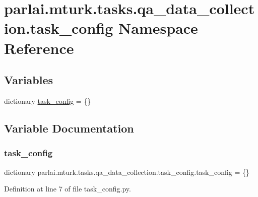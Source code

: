 \hypertarget{namespaceparlai_1_1mturk_1_1tasks_1_1qa__data__collection_1_1task__config}{}\section{parlai.\+mturk.\+tasks.\+qa\+\_\+data\+\_\+collection.\+task\+\_\+config Namespace Reference}
\label{namespaceparlai_1_1mturk_1_1tasks_1_1qa__data__collection_1_1task__config}
\subsection*{Variables}
\begin{DoxyCompactItemize}
\item 
dictionary \hyperlink{namespaceparlai_1_1mturk_1_1tasks_1_1qa__data__collection_1_1task__config_adbd94419277813c88b000039a0ec9f85}{task\+\_\+config} = \{\}
\end{DoxyCompactItemize}


\subsection{Variable Documentation}
\mbox{\label{namespaceparlai_1_1mturk_1_1tasks_1_1qa__data__collection_1_1task__config_adbd94419277813c88b000039a0ec9f85}} 
\subsubsection{\texorpdfstring{task\+\_\+config}{task\_config}}
{\footnotesize\ttfamily dictionary parlai.\+mturk.\+tasks.\+qa\+\_\+data\+\_\+collection.\+task\+\_\+config.\+task\+\_\+config = \{\}}



Definition at line 7 of file task\+\_\+config.\+py.


